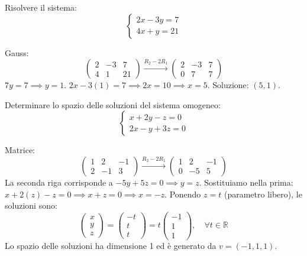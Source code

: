 \begin{exercisebox}[title={Esercizio 2: Sistema $2 \times 2$}]
Risolvere il sistema:
$$ \begin{cases} 2x - 3y = 7 \\ 4x + y = 21 \end{cases} $$
\end{exercisebox}

\begin{solbox}
Gauss:
$$ \left(\begin{array}{cc|c} 2 & -3 & 7 \\ 4 & 1 & 21 \end{array}\right) \xrightarrow{R_2 - 2R_1} 
\left(\begin{array}{cc|c} 2 & -3 & 7 \\ 0 & 7 & 7 \end{array}\right) $$
$7y = 7 \implies y = 1$.
$2x - 3(1) = 7 \implies 2x = 10 \implies x = 5$.
Soluzione: $(5, 1)$.
\end{solbox}

\begin{exercisebox}[title={Esercizio 3: Sistema Omogeneo}]
Determinare lo spazio delle soluzioni del sistema omogeneo:
$$ \begin{cases} x + 2y - z = 0 \\ 2x - y + 3z = 0 \end{cases} $$
\end{exercisebox}

\begin{solbox}
Matrice:
$$ \left(\begin{array}{ccc} 1 & 2 & -1 \\ 2 & -1 & 3 \end{array}\right) \xrightarrow{R_2 - 2R_1} 
\left(\begin{array}{ccc} 1 & 2 & -1 \\ 0 & -5 & 5 \end{array}\right) $$
La seconda riga corrisponde a $-5y + 5z = 0 \implies y = z$.
Sostituiamo nella prima: $x + 2(z) - z = 0 \implies x + z = 0 \implies x = -z$.
Ponendo $z = t$ (parametro libero), le soluzioni sono:
$$ \begin{pmatrix} x \\ y \\ z \end{pmatrix} = \begin{pmatrix} -t \\ t \\ t \end{pmatrix} = t \begin{pmatrix} -1 \\ 1 \\ 1 \end{pmatrix}, \quad \forall t \in \mathbb{R} $$
Lo spazio delle soluzioni ha dimensione 1 ed è generato da $v = (-1, 1, 1)$.
\end{solbox}
